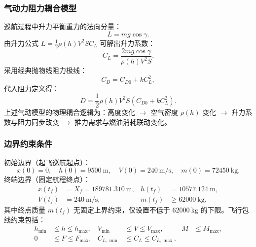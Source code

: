 \documentclass[withoutpreface,bwprint]{cumcmthesis}
\begin{document}
\subsubsection{气动力阻力耦合模型}

巡航过程中升力平衡重力的法向分量：
\begin{equation}
L = mg\cos\gamma.
\end{equation}
由升力公式 $L = \frac12\rho(h)V^2 S C_L$ 可解出升力系数：
\begin{equation}
C_L = \frac{2mg\cos\gamma}{\rho(h)V^2 S}.
\label{eq:q3_CL}
\end{equation}
采用经典抛物线阻力极线：
\begin{equation}
C_D = C_{D0} + k C_L^2,
\end{equation}
代入阻力定义得：
\begin{equation}
D = \frac12\rho(h)V^2 S \left(C_{D0} + k C_L^2\right).
\label{eq:q3_drag}
\end{equation}
上述气动模型的物理耦合逻辑为：高度变化 $\rightarrow$ 空气密度 $\rho(h)$ 变化 $\rightarrow$ 升力系数与阻力同步改变 $\rightarrow$ 推力需求与燃油消耗联动变化。

\subsubsection{边界约束条件}

初始边界（起飞巡航起点）：
\begin{equation}
x(0)=0,\quad h(0)=9500\ \mathrm{m},\quad V(0)=240\ \mathrm{m/s},\quad m(0)=72450\ \mathrm{kg}.
\label{eq:q3_initial}
\end{equation}
终端边界（固定航程终点）：
\begin{equation}
\begin{aligned}
x(t_f)&=X_f=189781.310\ \mathrm{m},&
h(t_f)&=10577.124\ \mathrm{m},\\
V(t_f)&=240\ \mathrm{m/s},&
m(t_f)&\geq 62000\ \mathrm{kg}.
\end{aligned}
\label{eq:q3_terminal}
\end{equation}
其中终点质量 $m(t_f)$ 无固定上界约束，仅设置不低于 $62000\ \mathrm{kg}$ 的下限。飞行包线约束包括：
\begin{equation}
\begin{aligned}
h_{\min}&\leq h\leq h_{\max},&
V_{\min}&\leq V\leq V_{\max},&
M&\leq M_{\max},\\
0&\leq F\leq F_{\max},&
C_{L,\min}&\leq C_L\leq C_{L,\max}.
\end{aligned}
\label{eq:q3_path_constraints}
\end{equation}
\end{document}
